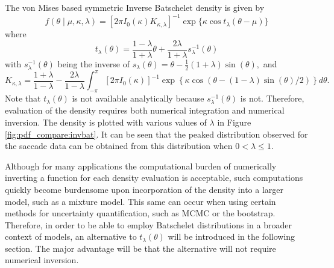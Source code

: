 The von Mises based symmetric Inverse Batschelet density is given by
\begin{equation} \label{eqn:invbatpdf}
 f(\theta \mid \mu, \kappa, \lambda) = [2\pi I_0(\kappa)K_{\kappa, \lambda}]^{-1} \exp\{\kappa \cos t_\lambda(\theta - \mu)\}
\end{equation}
where
\begin{equation} \label{eqn:invbattransform}
  t_\lambda(\theta) = \frac{1 - \lambda}{1 + \lambda}\theta + \frac{2\lambda}{1 + \lambda} s_\lambda^{-1}(\theta)
\end{equation}
with \(s_\lambda^{-1}(\theta)\) being the inverse of \(s_\lambda(\theta) = \theta - \frac{1}{2} (1 + \lambda) \sin(\theta),\) and
\begin{equation}
   K_{\kappa, \lambda} = \frac{1 + \lambda}{1 - \lambda} - \frac{2\lambda}{1 - \lambda} \int_{-\pi}^\pi [2\pi I_0(\kappa)]^{-1} \exp\left\{\kappa \cos \left(\theta -  (1 - \lambda) \sin(\theta) / 2 \right) \right\} d\theta.
\end{equation}
Note that \(t_\lambda(\theta)\) is not available analytically because \(s_\lambda^{-1}(\theta)\) is not.  Therefore, evaluation of the density requires both numerical integration and numerical inversion. The density is plotted with various values of \(\lambda\) in Figure \ref{fig:pdf_compare:invbat}. It can be seen that the peaked distribution observed for the saccade data can be obtained from this distribution when \(0 < \lambda \leq 1.\)

Although for many applications the computational burden of numerically inverting a function for each density evaluation is acceptable, such computations quickly become burdensome upon incorporation of the density into a larger model, such as a mixture model. This same can occur when using certain methods for uncertainty quantification, such as MCMC or the bootstrap. Therefore, in order to be able to employ Batschelet distributions in a broader context of models, an alternative to  \(t_\lambda(\theta)\) will be introduced in the following section. The major advantage will be that the alternative will not require numerical inversion.

